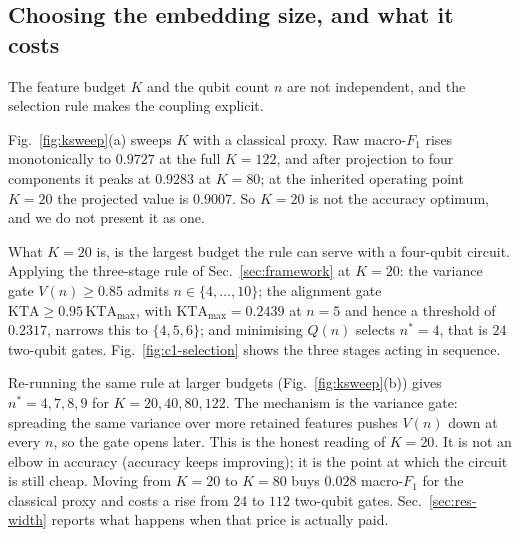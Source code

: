 %
%

\subsection{Choosing the embedding size, and what it costs}
\label{sec:res-c1}

\begin{revbody}


The feature budget $K$ and the qubit count $n$ are not independent, and the
selection rule makes the coupling explicit.

Fig.~\ref{fig:ksweep}(a) sweeps $K$ with a classical proxy. Raw macro-$F_1$ rises
monotonically to $0.9727$ at the full $K=122$, and after projection to four
components it peaks at $0.9283$ at $K=80$; at the inherited operating point
$K=20$ the projected value is $0.9007$. So $K=20$ is not the accuracy optimum,
and we do not present it as one.

What $K=20$ is, is the largest budget the rule can serve with a four-qubit
circuit. Applying the three-stage rule of Sec.~\ref{sec:framework} at $K=20$:
the variance gate $V(n)\geq0.85$ admits $n\in\{4,\dots,10\}$; the alignment gate
$\mathrm{KTA}\geq0.95\,\mathrm{KTA}_{\max}$, with $\mathrm{KTA}_{\max}=0.2439$
at $n=5$ and hence a threshold of $0.2317$, narrows this to $\{4,5,6\}$; and
minimising $Q(n)$ selects $n^\ast=4$, that is $24$ two-qubit gates.
Fig.~\ref{fig:c1-selection} shows the three stages acting in sequence.

Re-running the same rule at larger budgets (Fig.~\ref{fig:ksweep}(b)) gives
$n^\ast = 4, 7, 8, 9$ for $K = 20, 40, 80, 122$. The mechanism is the variance
gate: spreading the same variance over more retained features pushes $V(n)$ down
at every $n$, so the gate opens later. This is the honest reading of $K=20$. It
is not an elbow in accuracy (accuracy keeps improving); it is the point at
which the circuit is still cheap. Moving from $K=20$ to $K=80$ buys $0.028$
macro-$F_1$ for the classical proxy and costs a rise from $24$ to $112$
two-qubit gates. Sec.~\ref{sec:res-width} reports what happens when that price
is actually paid.
\end{revbody}

